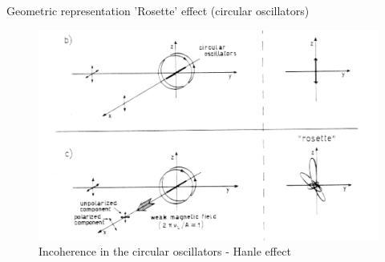 \documentclass{beamer}
\begin{document}
\begin{frame}{Geometric representation}
'Rosette' effect (circular oscillators)
\begin{figure}[H]
 \centering
 \includegraphics[scale=0.5]{a2.png}
  \caption{Incoherence in the circular oscillators - Hanle effect}
\end{figure}
\end{frame}
\end{document}
